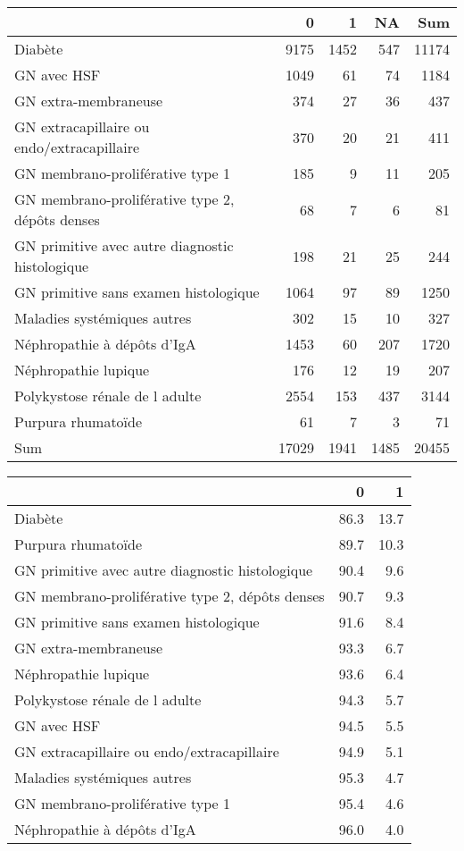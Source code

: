 \documentclass[11pt,a4paper]{article}\usepackage[]{graphicx}\usepackage[]{color}
\begin{document}
\begin{table}[H]
\centering
\begin{tabular}{lrrrr}
  \hline
 & 0 & 1 & NA & Sum \\ 
  \hline
Diabète & 9175 & 1452 & 547 & 11174 \\ 
  GN avec HSF & 1049 & 61 & 74 & 1184 \\ 
  GN extra-membraneuse & 374 & 27 & 36 & 437 \\ 
  GN extracapillaire ou endo/extracapillaire & 370 & 20 & 21 & 411 \\ 
  GN membrano-proliférative type 1 & 185 & 9 & 11 & 205 \\ 
  GN membrano-proliférative type 2, dépôts denses & 68 & 7 & 6 & 81 \\ 
  GN primitive avec autre diagnostic histologique & 198 & 21 & 25 & 244 \\ 
  GN primitive sans examen histologique & 1064 & 97 & 89 & 1250 \\ 
  Maladies systémiques autres & 302 & 15 & 10 & 327 \\ 
  Néphropathie à dépôts d'IgA & 1453 & 60 & 207 & 1720 \\ 
  Néphropathie lupique & 176 & 12 & 19 & 207 \\ 
  Polykystose rénale de l adulte & 2554 & 153 & 437 & 3144 \\ 
  Purpura rhumatoïde & 61 & 7 & 3 & 71 \\ 
  Sum & 17029 & 1941 & 1485 & 20455 \\ 
   \hline
\end{tabular}
\end{table}
\begin{table}[H]
\centering
\begin{tabular}{lrr}
  \hline
 & 0 & 1 \\ 
  \hline
Diabète & 86.3 & 13.7 \\ 
  Purpura rhumatoïde & 89.7 & 10.3 \\ 
  GN primitive avec autre diagnostic histologique & 90.4 & 9.6 \\ 
  GN membrano-proliférative type 2, dépôts denses & 90.7 & 9.3 \\ 
  GN primitive sans examen histologique & 91.6 & 8.4 \\ 
  GN extra-membraneuse & 93.3 & 6.7 \\ 
  Néphropathie lupique & 93.6 & 6.4 \\ 
  Polykystose rénale de l adulte & 94.3 & 5.7 \\ 
  GN avec HSF & 94.5 & 5.5 \\ 
  GN extracapillaire ou endo/extracapillaire & 94.9 & 5.1 \\ 
  Maladies systémiques autres & 95.3 & 4.7 \\ 
  GN membrano-proliférative type 1 & 95.4 & 4.6 \\ 
  Néphropathie à dépôts d'IgA & 96.0 & 4.0 \\ 
   \hline
\end{tabular}
\end{table}
\end{document}
